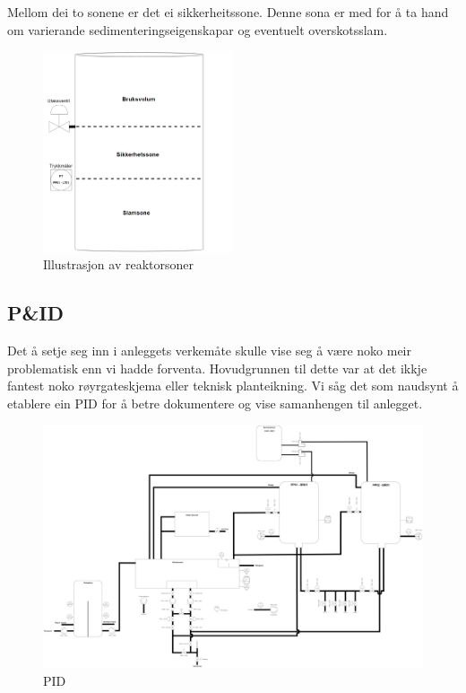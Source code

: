 Mellom dei to sonene er det ei sikkerheitssone.
Denne sona er med for å ta hand om varierande sedimenteringseigenskapar
og eventuelt overskotsslam.\newline

\begin{figure}[htbp]
    \centering
    \includegraphics[width=0.5\textwidth]{Figurar/Reaktorsoner.png}
    \caption{Illustrasjon av reaktorsoner}\label{fig:Reaktorsonar}
\end{figure}

\subsection{P\&ID}

Det å setje seg inn i anleggets verkemåte skulle vise seg å være noko meir problematisk enn vi hadde forventa.
Hovudgrunnen til dette var at det ikkje fantest noko røyrgateskjema eller teknisk planteikning. \newline
Vi såg det som naudsynt å etablere ein \gls{PID} for å betre dokumentere og vise samanhengen til anlegget.

\begin{figure}[htbp]
    \centering
    \includegraphics[angle=90,width=1\textwidth]{Figurar/PID.drawio.png}
    \caption{\gls{PID}}\label{fig:HMI}
\end{figure}